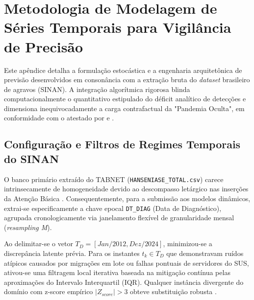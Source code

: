\chapter{Metodologia de Modelagem de Séries Temporais para Vigilância de Precisão}
\label{apendice:series_temporais}

Este apêndice detalha a formulação estocástica e a engenharia arquitetônica de previsão desenvolvidos em consonância com a extração bruta do \textit{dataset} brasileiro de agravos (SINAN). A integração algorítmica rigorosa blinda computacionalmente o quantitativo estipulado do déficit analítico de detecções e dimensiona inequivocadamente a carga contrafactual da "Pandemia Oculta", em conformidade com o atestado por \cite{mello2022paradox} e \cite{silva_cura_2024}.

\section{Configuração e Filtros de Regimes Temporais do SINAN}
\label{sec:dataset_sinan_ts}

O banco primário extraído do TABNET (\texttt{HANSENIASE\_TOTAL.csv}) carece intrinsecamente de homogeneidade devido ao descompasso letárgico nas inserções da Atenção Básica \cite{rocha_transparencia_2023}. Consequentemente, para a submissão aos modelos dinâmicos, extrai-se especificamente a chave epocal \texttt{DT\_DIAG} (Data de Diagnóstico), agrupada cronologicamente via janelamento flexível de granularidade mensal (\textit{resampling M}). 

Ao delimitar-se o vetor $T_D = [Jan/2012, Dez/2024]$, minimizou-se a discrepância latente prévia. Para os instantes $t_k \in T_D$ que demonstravam ruídos atípicos causados por migrações em lote ou falhas pontuais de servidores do SUS, ativou-se uma filtragem local iterativa baseada na mitigação contínua pelas aproximações do Intervalo Interquartil (IQR). Qualquer instância divergente do domínio com z-score empírico $|Z_{score}| > 3$ obteve substituição robusta \cite{pereira2021imputation}.

